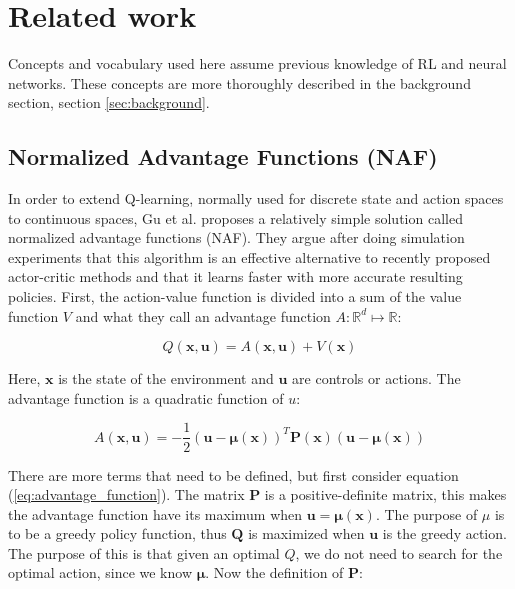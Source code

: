 \section{Related work}

Concepts and vocabulary used here assume previous knowledge of RL and neural
networks. These concepts are more thoroughly described in the background
section, section \ref{sec:background}.

\subsection{Normalized Advantage Functions (NAF)}

In order to extend Q-learning, normally used for discrete state and action
spaces to continuous spaces, Gu et al. \cite{gu2016continuous} proposes a
relatively simple solution called normalized advantage functions (NAF). They
argue after doing simulation experiments that this algorithm is an effective
alternative to recently proposed actor-critic methods and that it learns faster
with more accurate resulting policies. First, the action-value function is
divided into a sum of the value function $V$ and what they call an advantage
function $A : \mathbb{R}^d \longmapsto \mathbb{R}$:

\begin{equation}
    Q(\mathbf{x}, \mathbf{u}) = A(\mathbf{x}, \mathbf{u}) + V(\mathbf{x})
\end{equation}

Here, $\mathbf{x}$ is the state of the environment and $\mathbf{u}$ are
controls or actions. The advantage function is a quadratic function of $u$:

\begin{equation}
    A(\mathbf{x}, \mathbf{u}) = -\frac{1}{2}(\mathbf{u} - \mathbf{\mu(x)})^T\mathbf{P(x)}(\mathbf{u} - \mathbf{\mu(x)})
    \label{eq:advantage_function}
\end{equation}

There are more terms that need to be defined, but first consider equation
(\ref{eq:advantage_function}). The matrix $\mathbf{P}$ is a positive-definite
matrix, this makes the advantage function have its maximum when $\mathbf{u =
\mu(x)}$.  The purpose of $\mu$ is to be a greedy policy function, thus
$\mathbf{Q}$ is maximized when $\mathbf{u}$ is the greedy action. The purpose
of this is that given an optimal $Q$, we do not need to search for the optimal
action, since we know $\mathbf{\mu}$. Now the definition of $\mathbf{P}$:

